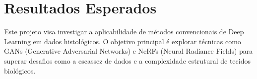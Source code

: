 \section{Resultados Esperados}

Este projeto visa investigar a aplicabilidade de métodos convencionais de Deep Learning em dados histológicos. O objetivo principal é explorar técnicas como GANs (Generative Adversarial Networks) e NeRFs (Neural Radiance Fields) para superar desafios como a escassez de dados e a complexidade estrutural de tecidos biológicos.

